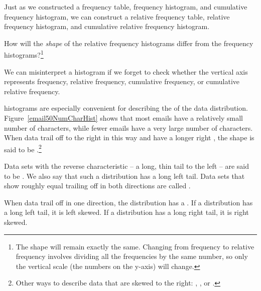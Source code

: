 {Just as we constructed a frequency table, frequency histogram, and cumulative frequency histogram, we can construct a relative frequency table, relative frequency histogram, and cumulative relative frequency histogram.  

\begin{exercise}How will the \emph{shape} of the relative frequency histograms differ from the frequency histograms?\footnote{The shape will remain exactly the same.  Changing from frequency to relative frequency involves dividing all the frequencies by the same number, so only the vertical scale (the numbers on the y-axis) will change.}
\end{exercise}


\begin{tipBox}{
We can misinterpret a histogram if we forget to check whether the vertical axis represents frequency, relative frequency, cumulative frequency, or cumulative relative frequency.}
\end{tipBox}

}


 histograms are especially convenient for describing the  of the data distribution\label{shapeFirstDiscussed}. Figure~\ref{email50NumCharHist} shows that most emails have a relatively small number of characters, while fewer emails have a very large number of characters. When data trail off to the right in this way and have a longer right , the shape is said to be .\footnote{Other ways to describe data that are skewed to the right: , , or .}

Data sets with the reverse characteristic -- a long, thin tail to the left -- are said to be . We also say that such a distribution has a long left tail. Data sets that show roughly equal trailing off in both directions are called .

\begin{termBox}{%
When data trail off in one direction, the distribution has a .  If a distribution has a long left tail, it is left skewed. If a distribution has a long right tail, it is right skewed.}
\end{termBox}

